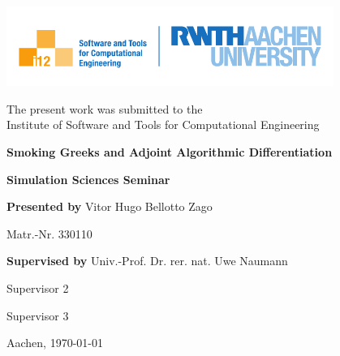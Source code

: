 \thispagestyle{empty}

\begin{flushright}
  \includegraphics[width=0.8\textwidth]{template/logos/rwth_i12_softw-werkz_en_cmyk.pdf}
\end{flushright}

\begin{center}
The present work was submitted to the\\
Institute of Software and Tools for Computational Engineering
  \vspace{2cm} 

  \textbf{\Huge Smoking Greeks and Adjoint Algorithmic Differentiation}

  \vspace{2cm} 

  \textbf{\large Simulation Sciences Seminar}  

  \vspace{3cm} 
\end{center}

\vfill 

\textbf{\normalsize{Presented by\phantom{Supervised by}}}
\normalsize{Vitor Hugo Bellotto Zago}
\par
\textbf{\normalsize{\phantom{Presented bySupervised by}}}
\normalsize{Matr.-Nr. 330110}

\vspace{1cm}

\textbf{\normalsize{Supervised by\phantom{Presented by Johannes Lotz}}}
\normalsize{Univ.-Prof. Dr. rer. nat. Uwe Naumann}
\par
\textbf{\normalsize{\phantom{Presented bySupervised by}}}
\normalsize{Supervisor 2}
\par
\textbf{\normalsize{\phantom{Presented bySupervised by}}}
\normalsize{Supervisor 3}

\vspace{2cm}
\small{}
\begin{flushright}
  Aachen, \today
\end{flushright}
